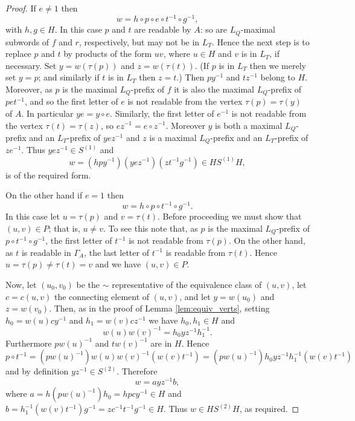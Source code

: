 \documentclass[a4paper,12pt]{article}
\newcommand{\G}{\Gamma }
\renewcommand{\t}{\tau }
\numberwithin{equation}{section}
\numberwithin{figure}{section}
\begin{document}
\begin{proof}
If $e\neq 1$ then
\[w=h\circ p \circ e\circ t^{-1}\circ g^{-1},\]
with $h,g\in H$. In this case $p$ and $t$ are readable by $A$:
so are $L_Q$-maximal subwords of $f$ and $r$, respectively, but
may not be in $L_T$. Hence the next step is to replace $p$ and $t$ by
products of the form $uv$, where $u\in H$ and  $v$ is in $L_T$,
 if necessary.
Set $y=w(\t(p))$ and  $z=w(\t(t))$. (If $p$ is in $L_T$ then we
merely set $y=p$; and similarly if $t$ is in $L_T$ then $z=t$.)
Then $py^{-1}$ and $tz^{-1}$ belong to $H$. Moreover, as $p$
is the maximal $L_Q$-prefix of $f$ it is also the maximal
$L_Q$-prefix of $pet^{-1}$,  and so
  the
first letter of $e$ is not readable from the vertex $\t(p)=\t(y)$
of $A$. In
particular $ye=y\circ e$. Similarly, the first letter of $e^{-1}$
is not readable from the vertex $\t(t)=\t(z)$, so $ez^{-1}=e\circ
z^{-1}$. Moreover $y$ is both a maximal $L_Q$-prefix  and an
$L_T$-prefix of $yez^{-1}$ and $z$ is a maximal $L_Q$-prefix  and
an $L_T$-prefix of $ze^{-1}$. Thus $yez^{-1}\in S^{(1)}$ and 
\[w=(h py^{-1}) (yez^{-1})(zt^{-1} g^{-1})\in HS^{(1)}H,\]
is of the required form.%

On the other hand if $e=1$ then
\[w=h\circ p\circ t^{-1}\circ g^{-1}.\]
In this case let $u=\t(p)$ and $v=\t(t)$.
Before proceeding we must show that $(u,v)\in P$; that is, $u\neq v$. 
To see this note that, as $p$ is the maximal $L_Q$-prefix of 
$p\circ t^{-1}\circ g^{-1}$, the first letter of $t^{-1}$ is not
readable from $\t(p)$. On the other hand, as $t$ is readable in $\G_A$,
the last letter of $t^{-1}$ is readable from $\t(t)$. Hence $u=\t(p)\neq
\t(t)=v$ and we have $(u,v)\in P$. 

Now, let $(u_0,v_0)$ be the $\sim$ representative
of the equivalence class of $(u,v)$, let $c=c(u,v)$ the connecting element of 
$(u,v)$, and let 
 $y=w(u_0)$ and $z=w(v_0)$. Then,  as in the proof of Lemma
\ref{lem:equiv_verts}, setting $h_0=w(u)cy^{-1}$ and
$h_1=w(v)cz^{-1}$ we have
 $h_0,h_1\in H$ and
\[w(u)w(v)^{-1}=h_0yz^{-1}h_1^{-1}.\] Furthermore
 $p w(u)^{-1}$ and  $t w(v)^{-1}$ are in $H$. Hence
\[
p\circ t^{-1}=( p w(u)^{-1})w(u)w(v)^{-1}( w(v)t^{-1})=( p w(u)^{-1}) h_0 yz^{-1}
h_1^{-1}( w(v)t^{-1})
\]
and by definition $yz^{-1}\in S^{(2)}$. Therefore 
\[w=a yz^{-1} b,\]
where $a=h ( p w(u)^{-1}) h_0=hpcy^{-1}\in H$ and $b=h_1^{-1}( w(v)t^{-1})g^{-1}
=zc^{-1}t^{-1}g^{-1}\in H$. Thus $w\in HS^{(2)}H$, as required.  


\end{proof}
\end{document}
